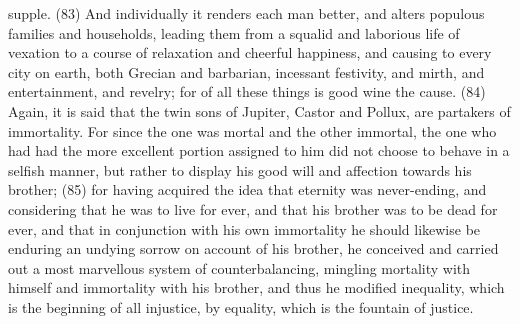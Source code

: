supple. (83) And individually it renders each man better, and alters populous families and
households, leading them from a squalid and laborious life of vexation to a course of relaxation
and cheerful happiness, and causing to every city on earth, both Grecian and barbarian, incessant
festivity, and mirth, and entertainment, and revelry; for of all these things is good wine the cause.
(84) Again, it is said that the twin sons of Jupiter, Castor and Pollux, are partakers of immortality.
For since the one was mortal and the other immortal, the one who had had the more excellent
portion assigned to him did not choose to behave in a selfish manner, but rather to display his good
will and affection towards his brother; (85) for having acquired the idea that eternity was
never-ending, and considering that he was to live for ever, and that his brother was to be dead for
ever, and that in conjunction with his own immortality he should likewise be enduring an undying
sorrow on account of his brother, he conceived and carried out a most marvellous system of
counterbalancing, mingling mortality with himself and immortality with his brother, and thus he
modified inequality, which is the beginning of all injustice, by equality, which is the fountain of
justice.

